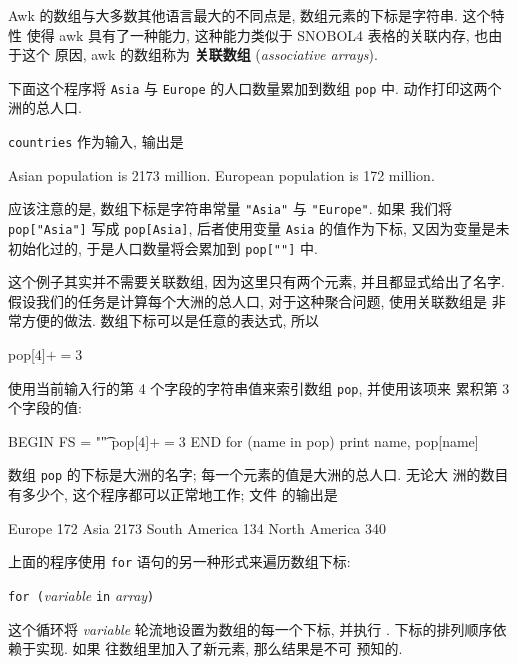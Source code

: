 Awk 的数组与大多数其他语言最大的不同点是, 数组元素的下标是字符串. 这个特性
使得 awk 具有了一种能力, 这种能力类似于 SNOBOL4 表格的关联内存, 也由于这个
原因, awk 的数组称为 \textbf{关联数组} (\emph{associative arrays}).

下面这个程序将 \verb'Asia' 与 \verb'Europe' 的人口数量累加到数组 \verb'pop'
中. \END 动作打印这两个洲的总人口.
\verb'countries' 作为输入, 输出是
\begin{file}
    Asian population is 2173 million.
    European population is 172 million.
\end{file}
应该注意的是, 数组下标是字符串常量 \verb'"Asia"' 与 \verb'"Europe"'. 如果
我们将 \verb'pop["Asia"]' 写成 \verb'pop[Asia]', 后者使用变量 \verb'Asia'
的值作为下标, 又因为变量是未初始化过的, 于是人口数量将会累加到
\verb'pop[""]' 中.

这个例子其实并不需要关联数组, 因为这里只有两个元素, 并且都显式给出了名字.
假设我们的任务是计算每个大洲的总人口, 对于这种聚合问题, 使用关联数组是
非常方便的做法. 数组下标可以是任意的表达式, 所以
\begin{awkcode}
    pop[$4] += $3
\end{awkcode}
使用当前输入行的第 4 个字段的字符串值来索引数组 \verb'pop', 并使用该项来
累积第 3 个字段的值:
\begin{awkcode}
    BEGIN   { FS = "\t" }
            { pop[$4] += $3 }
    END     { for (name in pop)
                print name, pop[name]
            }
\end{awkcode}
数组 \verb'pop' 的下标是大洲的名字; 每一个元素的值是大洲的总人口. 无论大
洲的数目有多少个, 这个程序都可以正常地工作; 文件 
的输出是
\begin{file}
    Europe 172
    Asia 2173
    South America 134
    North America 340
\end{file}
上面的程序使用 \verb'for' 语句的另一种形式来遍历数组下标:
\begin{pattern}
    \verb'for ('\textit{variable} \verb'in' \textit{array}\verb')' \par
        \indent\indent\stmt
\end{pattern}
这个循环将 \textit{variable} 轮流地设置为数组的每一个下标, 并执行 \stmt.
下标的排列顺序依赖于实现. 如果 \stmt 往数组里加入了新元素, 那么结果是不可
预知的.

